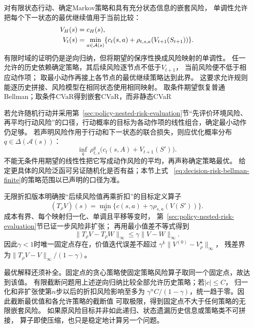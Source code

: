 对有限状态行动、确定Markov策略和具有充分状态信息的嵌套风险，
单调性允许把每个下一状态的最优继续值用于当前比较：
\begin{align}
  V_H(s)&=c_H(s),\notag\\
  V_t(s)&=\min_{a\in\mathcal A(s)}
    \{c_t(s,a)+\rho_{t,s,a}(V_{t+1}(S_{t+1}))\}.
  \label{eq:decision-risk-bellman-finite}
\end{align}
有限时域的证明仍是逆向归纳，但将期望的保序性换成风险映射的单调性。
任一允许的历史依赖确定策略，其后续风险逐节点不低于$V_{t+1}$，
当前风险便不低于相应动作项；
取最小动作再接上各节点的最优继续策略达到此界。
这要求允许规则能逐历史拼接、风险模型在相同状态使用相同映射。
取条件期望恢复普通Bellman；取条件CVaR得到嵌套CVaR，而非静态CVaR

若允许随机行动并采用第~\ref{sec:policy-nested-risk-evaluation}节“先评价环境风险、
再平均行动风险”的口径，行动概率的目标为各动作项的线性组合，确定最小动作仍足够。
若声明风险作用于行动和下一状态的联合损失，则应优化概率分布$q\in\Delta(\mathcal A(s))$：
\[
  \inf_q\,\rho^q_{t,s}\bigl(c_t(s,A)+V_{t+1}(S')\bigr).
\]
不能无条件用期望的线性性把它写成动作风险的平均，再声称确定策略最优。
给定更具体的风险泛函可另证随机化是否有益；本节上式
~\eqref{eq:decision-risk-bellman-finite}的策略范围以已声明的口径为准。

无限折扣版本明确按“后续风险值再乘折扣”的目标定义算子
\begin{equation}
  (T_\rho V)(s)=\min_a
    \{c(s,a)+\gamma\rho_{s,a}(V(S'))\}.
  \label{eq:decision-risk-bellman-operator}
\end{equation}
成本有界、每个映射归一化、单调且平移等变时，
第~\ref{sec:policy-nested-risk-evaluation}节已证一步风险非扩张；
再用最小值差不等式得到
\begin{equation}
  \lVert T_\rho V-T_\rho W\rVert_\infty
  \leq\gamma\lVert V-W\rVert_\infty.
  \label{eq:decision-risk-bellman-contraction}
\end{equation}
因此$\gamma<1$时唯一固定点存在，价值迭代误差不超过
$\gamma^k\lVert V^{(0)}-V^\star_\rho\rVert_\infty$，
残差界为$\lVert T_\rho V-V\rVert_\infty/(1-\gamma)$。

最优解释还须补全。固定点的贪心策略使固定策略风险算子取同一个固定点，故达到该值。
有限截断问题用上述逆向归纳比较全部允许历史策略；若$|c|\leq C$，
归一化和非扩张使第$n$步以后的折扣风险影响至多为
$\gamma^nC/(1-\gamma)$，统一趋于零。因此截断最优值和各允许策略的截断值
可取极限，得到固定点不大于任何策略的无限嵌套风险。
如果原风险目标并非如此递归、状态遗漏历史信息或策略类不可拼接，
算子即使压缩，也只是稳定地计算另一个问题。

